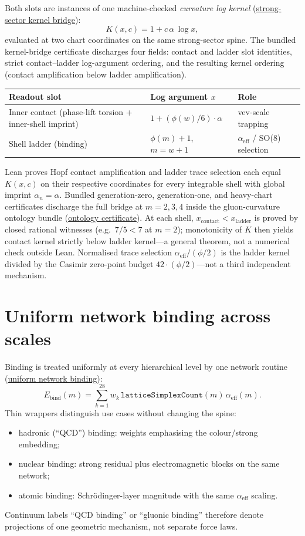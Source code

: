\documentclass[11pt]{amsart}
\begin{document}
Both slots are instances of one machine-checked \emph{curvature log kernel}
(\hyperref[lean:kernel-bridge]{strong-sector kernel bridge}):
\[
K(x,c)=1+c\,\alpha\,\log x,
\]
evaluated at two chart coordinates on the same strong-sector spine. The bundled
kernel-bridge certificate discharges four fields: contact and ladder slot identities,
strict contact--ladder log-argument ordering, and the resulting kernel ordering
(contact amplification below ladder amplification).
\begin{center}
\small
\begin{tabularx}{\textwidth}{@{}>{\raggedright\arraybackslash}X
  >{\raggedright\arraybackslash}p{}
  >{\raggedright\arraybackslash}p{}@{}}
\toprule
Readout slot & Log argument $x$ & Role \\
\midrule
Inner contact (phase-lift torsion + inner-shell imprint)
  & $1+(\phi(w)/6)\cdot\alpha$ & vev-scale trapping \\
Shell ladder (binding)
  & $\phi(m)+1$, $m=w+1$ & $\alpha_{\mathrm{eff}}$ / SO(8) selection \\
\bottomrule
\end{tabularx}
\end{center}
Lean proves Hopf contact amplification and ladder trace selection each equal $K(x,c)$
on their respective coordinates for every integrable shell with global imprint
$\alpha_n=\alpha$. Bundled generation-zero, generation-one, and heavy-chart
certificates discharge the full bridge at $m=2,3,4$ inside the gluon-curvature
ontology bundle (\hyperref[lean:gluon-closure]{ontology certificate}).
At each shell, $x_{\mathrm{contact}}<x_{\mathrm{ladder}}$ is proved by closed
rational witnesses (e.g.\ $7/5<7$ at $m=2$); monotonicity of $K$ then yields
contact kernel strictly below ladder kernel---a general theorem, not a numerical
check outside Lean.
Normalised trace selection
$\alpha_{\mathrm{eff}}/(\phi/2)$ is the ladder kernel divided by the Casimir
zero-point budget $42\cdot(\phi/2)$---not a third independent mechanism.

\section{Uniform network binding across scales}
\label{sec:uniform-binding}

Binding is treated uniformly at every hierarchical level by one network routine
(\hyperref[lean:binding-network]{uniform network binding}):
\[
E_{\mathrm{bind}}(m)=\sum_{k=1}^{28} w_k\,\texttt{latticeSimplexCount}(m)\,\alpha_{\mathrm{eff}}(m).
\]
Thin wrappers distinguish use cases without changing the spine:
\begin{itemize}[nosep]
\item hadronic (``QCD'') binding: weights emphasising the colour/strong embedding;
\item nuclear binding: strong residual plus electromagnetic blocks on the same network;
\item atomic binding: Schr\"odinger-layer magnitude with the same $\alpha_{\mathrm{eff}}$ scaling.
\end{itemize}
Continuum labels ``QCD binding'' or ``gluonic binding'' therefore denote
projections of one geometric mechanism, not separate force laws.
\end{document}
